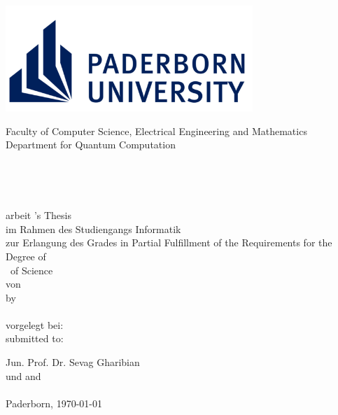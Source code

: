 
\thispagestyle{empty}
\begin{titlepage}
\begin{center}

	\begin{minipage}{14cm}		
		\hspace*{1.9cm}
		\includegraphics[height=4cm]{figures/upb_logo_en}\\
		\hspace*{1.15cm}
		\begin{minipage}{14.5cm}
			\vspace*{5pt}
			\textsf{\noindent
			Faculty of Computer Science, Electrical Engineering and Mathematics\\
			Department for Quantum Computation
			}
		\end{minipage}		
	\end{minipage}\\[60pt]
	
	\begin{doublespace}
		{\Huge\textbf{\Title}}\\[30pt]
	\end{doublespace} 
	
	{\Large 
		\ifgerman
			\Degree arbeit
		\else
			\Degree 's Thesis
		\fi
	}\\[6pt]
		\ifgerman
			im Rahmen des Studiengangs Informatik\\
			zur Erlangung des Grades
		\else
			in Partial Fulfillment of the Requirements for the\\
			Degree of
		\fi
		\\[6pt]
  	{\Large \Degree\ of Science}\\[54pt] %
	
	\ifgerman
		von\\
	\else
		by\\
	\fi
	{\scshape\large \Author}\\[54pt]
	
	\ifgerman
		vorgelegt bei:\\
	\else
		submitted to:\\
	\fi
	
	{\large Jun. Prof. Dr. Sevag Gharibian \\
	\ifgerman
		und
	\else
		and
	\fi
	\\[6pt]
	\large \SecondExaminer}\\[30pt]

	{Paderborn, \today}
	
\end{center}
\end{titlepage}
\clearpage